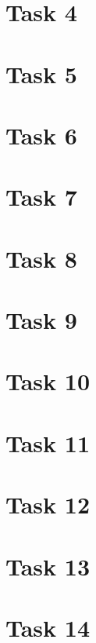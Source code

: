 \documentclass[a4paper,12pt,oneside,onecolumn]{article} %
\begin{document}
\section*{Task 4}
%

\section*{Task 5}
%

\section*{Task 6}
%

\section*{Task 7}
%

\section*{Task 8}
%

\section*{Task 9}
%

\section*{Task 10}
%

\section*{Task 11}
%

\section*{Task 12}
%

\section*{Task 13}
%

\section*{Task 14}
%
\end{document}
